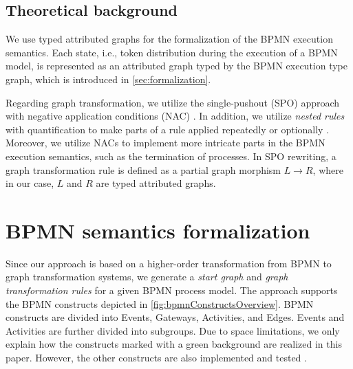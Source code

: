 \documentclass[runningheads]{llncs}
\begin{document}
\subsection{Theoretical background}
We use typed attributed graphs for the formalization of the BPMN execution semantics.
Each state, i.e., token distribution during the execution of a BPMN model, is represented as an attributed graph typed by the BPMN execution type graph, which is introduced in \autoref{sec:formalization}.

Regarding graph transformation, we utilize the single-pushout (SPO) approach with negative application conditions (NAC) \cite{ehrigALGEBRAICAPPROACHESGRAPH1997}.
In addition, we utilize \emph{nested rules} with quantification to make parts of a rule applied repeatedly or optionally \cite{rensinkNestedQuantificationGraph2006,rensinkHowMuchAre2017}.
Moreover, we utilize NACs to implement more intricate parts in the BPMN execution semantics, such as the termination of processes. 
In SPO rewriting, a graph transformation rule is defined as a partial graph morphism $L \to R$, where in our case, $L$ and $R$ are typed attributed graphs. 



\section{BPMN semantics formalization} \label{sec:formalization}

Since our approach is based on a higher-order transformation from BPMN to graph transformation systems, we generate a \emph{start graph} and \emph{graph transformation rules} for a given BPMN process model.
The approach supports the BPMN constructs depicted in \autoref{fig:bpmnConstructsOverview}.
BPMN constructs are divided into \textsf{Events}, \textsf{Gateways}, \textsf{Activities}, and \textsf{Edges}.
\textsf{Events} and \textsf{Activities} are further divided into subgroups.
Due to space limitations, we only explain how the constructs marked with a green background are realized in this paper.
However, the other constructs are also implemented and tested \cite{krauterArtifactsICGT2023}.
\end{document}
